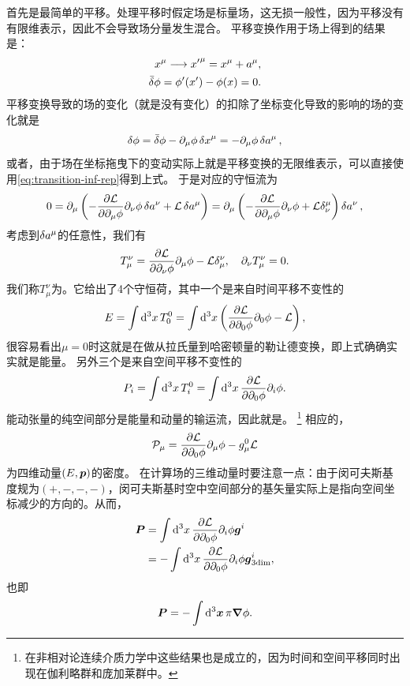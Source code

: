 首先是最简单的平移。处理平移时假定场是标量场，这无损一般性，因为平移没有有限维表示，因此不会导致场分量发生混合。
平移变换作用于场上得到的结果是：
\[
    \begin{split}
        x^\mu \longrightarrow {x'}^{\mu} = x^\mu + a^\mu, \\
        \bar{\var}{\phi} = \phi'(x') - \phi(x) = 0.
    \end{split}
\]
平移变换导致的场的变化（就是没有变化）的扣除了坐标变化导致的影响的场的变化就是
\[
    \var{\phi} = \bar{\var}{\phi} - \partial_\mu \phi \var{x}^\mu = - \partial_\mu \phi \var{a^\mu},
\]
或者，由于场在坐标拖曳下的变动实际上就是平移变换的无限维表示，可以直接使用\eqref{eq:transition-inf-rep}得到上式。
于是对应的守恒流为
\[
    0 = \partial_\mu \left( - \pdv{\mathcal{L}}{\partial_\mu \phi} \partial_\nu \phi \var{a^\nu} + \mathcal{L} \var{a^\mu} \right) 
    = \partial_\mu \left( - \pdv{\mathcal{L}}{\partial_\mu \phi} \partial_\nu \phi + \mathcal{L} \delta^\mu_\nu \right) \var{a^\nu},
\]
考虑到$\var{a^\mu}$的任意性，我们有
\begin{equation}
    T_\mu^\nu = \pdv{\mathcal{L}}{\partial_\nu \phi} \partial_\mu \phi - \mathcal{L} \delta^\nu_\mu, \quad \partial_\nu T_\mu^\nu = 0.
\end{equation}
我们称$T^\nu_\mu$为。它给出了4个守恒荷，其中一个是来自时间平移不变性的
\begin{equation}
    E = \int \dd[3]{x} T^0_0 = \int \dd[3]{x} \left( \pdv{\mathcal{L}}{\partial_0 \phi} \partial_0 \phi - \mathcal{L} \right) ,
    \label{eq:field-energy}
\end{equation}
很容易看出$\mu=0$时这就是在做从拉氏量到哈密顿量的勒让德变换，即上式确确实实就是能量。
另外三个是来自空间平移不变性的
\begin{equation}
    P_i = \int \dd[3]{x} T^0_i = \int \dd[3]{x} \pdv{\mathcal{L}}{\partial_0 \phi} \partial_i \phi .
    \label{eq:field-momentum}
\end{equation}
能动张量的纯空间部分是能量和动量的输运流，因此就是。%
\footnote{在非相对论连续介质力学中这些结果也是成立的，因为时间和空间平移同时出现在伽利略群和庞加莱群中。}
相应的，
\begin{equation}
    \mathcal{P}_\mu = \pdv{\mathcal{L}}{\partial_0 \phi} \partial_\mu \phi - g_\mu^0 \mathcal{L}
\end{equation}
为四维动量$(E, \vb*{p})$的密度。
在计算场的三维动量时要注意一点：由于闵可夫斯基度规为$(+, -, -, -)$，闵可夫斯基时空中空间部分的基矢量实际上是指向空间坐标减少的方向的。从而，
\[
    \begin{aligned}
        \vb*{P} &= \int \dd[3]{x} \pdv{\mathcal{L}}{\partial_0 \phi} \partial_i \phi \vb*{g}^i \\
        &= - \int \dd[3]{x} \pdv{\mathcal{L}}{\partial_0 \phi} \partial_i \phi \vb*{g}^i_{\text{3dim}},
    \end{aligned}
\]
也即
\begin{equation}
    \vb*{P} = - \int \dd[3]{\vb*{x}} \pi \grad{\phi}.
\end{equation}

